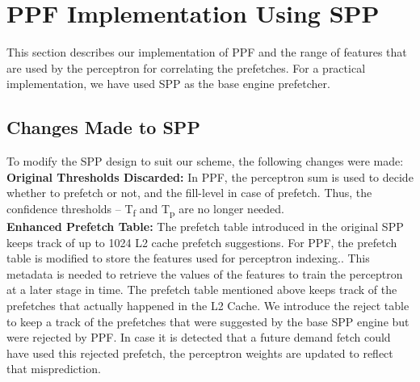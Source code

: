 \section{PPF Implementation Using SPP}
\label{Impl}

This section describes our implementation of PPF and the range of
features that are used by the perceptron for correlating the
prefetches. For a practical implementation, we have used SPP as the
base engine prefetcher.

\subsection{Changes Made to SPP}
\label{Impl-Changes}
To modify the SPP design to suit our scheme, the following changes were made:\\
%
\textbf{Original Thresholds Discarded:} In PPF, the perceptron sum is used to
decide whether to prefetch or not, and the fill-level in case of prefetch.
Thus, the confidence thresholds -- T\textsubscript{f} and T\textsubscript{p}
are no longer needed. \\
%
%
%
%
\textbf{Enhanced Prefetch Table:} The prefetch table introduced in the
original SPP keeps track of up to 1024 L2 cache prefetch suggestions. For
PPF, the prefetch table is modified to store the features used for perceptron
indexing.. This metadata is needed to retrieve the values of the features to
train the perceptron at a later stage in time. The prefetch table mentioned
above keeps track of the prefetches that actually happened in the L2 Cache.
We introduce the reject table to keep a track of the prefetches that were
suggested by the base SPP engine but were rejected by PPF. In case it is
detected that a future demand fetch could have used this rejected prefetch,
the perceptron weights are updated to reflect that misprediction. 

